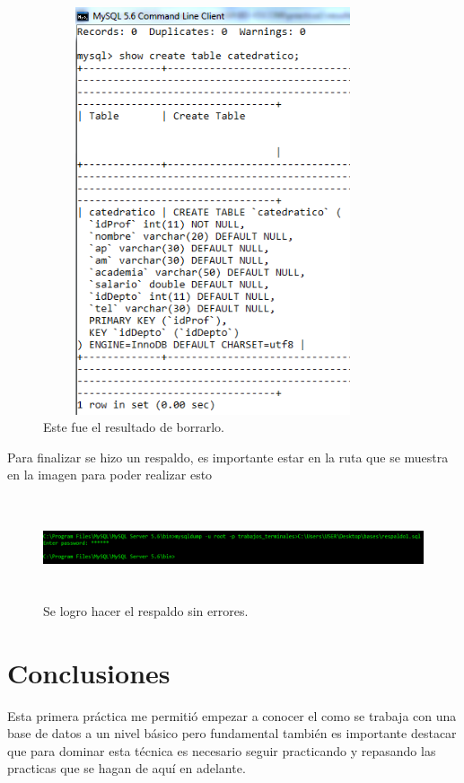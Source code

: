 \documentclass[12pt, titlepage]{article}
\begin{document}
\begin{figure}[H]
    \begin{center}
        \includegraphics[width=10cm, height=12cm]{img/constraint2.png}
        \caption{Este fue el resultado de borrarlo.}
        \label{fig:constraint2}
    \end{center}
\end{figure}
    Para finalizar se hizo un respaldo, es importante estar en la ruta que se muestra en la imagen para poder realizar esto
    \begin{figure}[H]
        \begin{center}
            \includegraphics[width=16cm, height=3cm]{img/respaldo.png}
            \caption{Se logro hacer el respaldo sin errores.}
            \label{fig:respaldo}
        \end{center}
    \end{figure}
    \section{Conclusiones}
    Esta primera práctica me permitió empezar a conocer el como se trabaja con una base de datos a un nivel básico pero fundamental también es importante destacar que para dominar esta técnica es necesario seguir practicando y repasando las practicas que se hagan de aquí en adelante.
     
    
\end{document}

